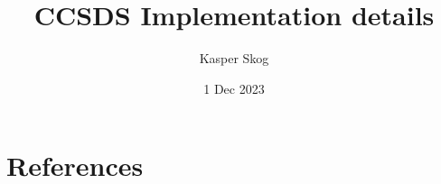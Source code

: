 \documentclass[english, 12pt, a4paper, pdftexm sci, utf8]{article}
\title{CCSDS Implementation details}
\author{Kasper Skog}
\date{1 Dec 2023}
\begin{document}
\maketitle


\section{References}
\listoffigures


\end{document}
